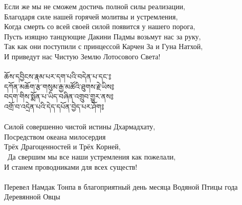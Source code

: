 Если же мы не сможем достичь полной силы реализации,\\
Благодаря силе нашей горячей молитвы и устремления,\\
Когда смерть со всей своей силой появится у нашего порога,\\
Пусть изящно танцующие Дакини Падмы возьмут нас за руку,\\
Так как они поступили с принцессой Карчен За и Гуна Натхой,\\
И приведут нас Чистую Землю Лотосового Света!\\
\\
{\ti ཆོས་དབྱིངས་རྣམ་པར་དག་པའི་བདེན་པ་དང་༔\\
དཀོན་མཆོག་རྩ་གསུམ་རྒྱ་མཚོའི་ཐུགས་རྗེ་ཡིས༔\\
བདག་གིས་སྨོན་པ་ཡིད་བཞིན་འགྲུབ་གྱུར་ནས༔\\
འགྲོ་བ་འདྲེན་པའི་དེད་དཔོན་བྱེད་པར་ཤོག༔}\\
\\
Силой совершенно чистой истины Дхармадхату,\\
Посредством океана милосердия \\ \indent Трёх Драгоценностей и Трёх Корней,\\\
Да свершим мы все наши устремления как пожелали,\\
И станем проводниками для всех существ!\\
\\
\scriptsize Перевел Намдак Тонпа в благоприятный день месяца Водяной Птицы года Деревянной Овцы\normalsize

